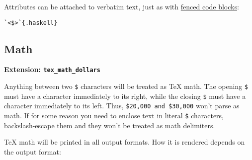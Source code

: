 \documentclass[]{article}
\begin{document}
Attributes can be attached to verbatim text, just as with
\hyperref[fenced-code-blocks]{fenced code blocks}:

\begin{verbatim}
`<$>`{.haskell}
\end{verbatim}

\subsection{Math}

\textbf{Extension: \texttt{tex\_math\_dollars}}

Anything between two \texttt{\$} characters will be treated as TeX math.
The opening \texttt{\$} must have a character immediately to its right,
while the closing \texttt{\$} must have a character immediately to its
left. Thus, \texttt{\$20,000 and \$30,000} won't parse as math. If for
some reason you need to enclose text in literal \texttt{\$} characters,
backslash-escape them and they won't be treated as math delimiters.

TeX math will be printed in all output formats. How it is rendered
depends on the output format:
\end{document}
